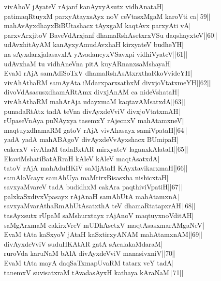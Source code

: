 \documentclass{article}
\begin{document}
vivAhoV jAyateV rAjanf kanAyxyAsutx vidhAnataH|\\
patimaqRtuyxM parxyAtayxsAyx noV ceVtasxMgaM karoVti ca||59||\\
mahAvAyxdhayxBiBUtashacx tAyxgaM kaqtAvx parxyAti vA|\\
parxvArxjitoV BaveVdArxjanf dhamaRshAsetxrxVSu daqshayxteV||60||\\
udAvxhitAyAM kanAyxyAmudAvxhaH kirxyateV budheYH|\\
na sAyxdarxjalasavxlA yAvadaneyxVSavxpi vidhiVyateV||61||\\
udAvxhaM tu vidhAneVna pitA kuyARnanxsaMshayaH|\\
EvaM rAjA samAdiSoTxV dhamaRshAsAtxrxthaRkoVvideYH|\\
vivAhAthaRM samAyAta iMdarxparxsathxM divxjoVtatxmeYH||62||\\
divoVdAsasusxdhamARtAmx divxjAnAM ca nideVshataH|\\
vivAhAthaRM mahArAja udayxmaM kaqtavAMsatxdA||63||\\
punadaRtAtx tadA teVna divAyxdeVviV divxjoVtatxmAH|\\
rUpaseVnAya puNAyxya tasemxY rAjecnxV mahAtamxneV|\\
maqtuyxdhamaRM gatoV rAjA vivAhasayx samiVpataH||64||\\
yadA yadA mahABAgoV divAyxdeVvAyxshacx BUmipaH|\\
cakerxV vivAhaM tadaBxtAR mirxyateV laganxkAlataH||65||\\
EkaviMshatiBatARraH kAleV kAleV maqtAsatxdA|\\
tatoV rAjA mahAduHKiV saMjAtaH KAyxtavikarxmaH||66||\\
samAloVcayx samAhUya maMtirxBisasxha nishicxtaH|\\
savxyaMvareV tadA budidhxM cakAra paqthiviVpatiH||67||\\
palxkaSxdivxVpasayx rAjAnaH samAhUtA mahAtamxnA|\\
savxyaMvarAthaRmAhUtAsatxthA teV dhamaRtatapxrAH||68||\\
tasAyxsutx rUpaM saMshurxtayx rAjAnoV maqtuyxnoVditAH|\\
saMgArxmaM cakirxVreV mUDhAsetxV maqtAsasxmarAMgaNeV|\\
EvaM tAta kaSxyoV jAtaH kaSxtirxyANAM mahAtamxnAM||69||\\
divAyxdeVviV suduHKAtAR gatA sAcalakaMdaraM|\\
ruroVda karuNaM bAlA divAyxdeVviV manasivxniV||70||\\
EvaM tAta mayA daqSaTxmapUvaRM tatarx veY tadA|\\
tanemxV suvisatxraM tAvadasAyxH kathaya kAraNaM||71||
\end{document}
